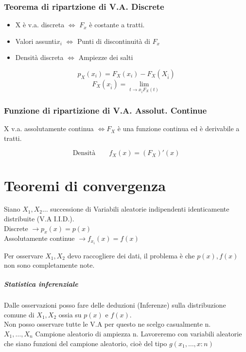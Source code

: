 \documentclass[12pt, a4paper, openany]{book}
\begin{document}
\subsection*{Teorema di ripartzione di V.A. Discrete}
\begin{itemize}
    \item X è v.a. discreta $\Leftrightarrow$ $F_x$ è costante a tratti.
    \item Valori assunti{$x_i$} $\Leftrightarrow$ Punti di discontinuità  di $F_x$
    \item Densità discreta $\Leftrightarrow$ Ampiezze dei salti
\end{itemize}
\begin{equation*}
    p_X (x_i) = F_X(x_i) - F_X(X_{\bar{i}})
\end{equation*}
\begin{equation*}
    F_X(x_{\bar{i}}) = \lim_{t \to x_{\bar{i}} F_X(t)}  
\end{equation*}
\subsection*{Funzione di ripartizione di V.A. Assolut. Continue}
X v.a. assolutamente continua $\Leftrightarrow F_X$ è una funzione continua ed
è derivabile a tratti.

\begin{equation}
    \text{Densità} \qquad f_X(x) = (F_X)'(x)
\end{equation}






\chapter{Teoremi di convergenza}
Siano $X_1, X_2 \dots $ successione di Variabili aleatorie indipendenti identicamente distribuite (V.A I.I.D.).
\\ Discrete $ \rightarrow p_x(x) = p(x) $
\\ Assolutamente continue $ \rightarrow f_{x_i} (x) = f(x) $

Per osservare $X_1, X_2$ devo raccogliere dei dati, il problema è che $p(x), f(x)$ non sono completamente
note. 
\paragraph*{Statistica inferenziale} Dalle osservazioni posso fare delle deduzioni (Inferenze) sulla distribuzione
comune di $X_1, X_2$ ossia su $p(x)$ e $f(x)$.
\\ Non posso osservare tutte le V.A per questo ne scelgo casualmente n. 
\\ $X_1, \dots ,X_n$ Campione aleatorio di ampiezza n. Lavoreremo con variabili aleatorie che siano funzioni del 
campione aleatorio, cioè del tipo $g(x_1, \dots ,x:n)$
\end{document}
